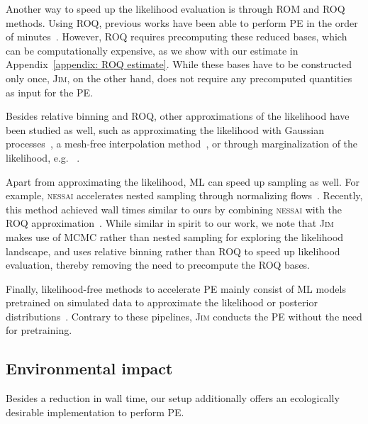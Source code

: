 \documentclass[prd,twocolumn,a4paper,floatfix,nofootinbib,preprintnumbers,superscriptaddress]{revtex4-1}
\begin{document}
Another way to speed up the likelihood evaluation is through \ac{ROM} and \ac{ROQ} methods. Using \ac{ROQ}, previous works have been able to perform \ac{PE} in the order of minutes~\cite{Canizares:2014fya, Morisaki:2020oqk, Morisaki:2023kuq}. However, \ac{ROQ} requires precomputing these reduced bases, which can be computationally expensive, as we show with our estimate in Appendix~\ref{appendix: ROQ estimate}. While these bases have to be constructed only once, \textsc{Jim}, on the other hand, does not require any precomputed quantities as input for the \ac{PE}.

Besides relative binning and \ac{ROQ}, other approximations of the likelihood have been studied as well, such as approximating the likelihood with Gaussian processes~\cite{Pankow:2015cra, Lange:2018pyp, Wysocki:2019grj},  a mesh-free interpolation method~\cite{Pathak:2022iar, Pathak:2023ixb}, or through marginalization of the likelihood, e.g. ~\cite{Roulet:2024hwz}. 

Apart from approximating the likelihood, \ac{ML} can speed up sampling as well. For example, \textsc{nessai} accelerates nested sampling through normalizing flows~\cite{Williams:2021qyt}. Recently, this method achieved wall times similar to ours by combining \textsc{nessai} with the \ac{ROQ} approximation~\cite{Williams:2023ppp}. While similar in spirit to our work, we note that \textsc{Jim} makes use of \ac{MCMC} rather than nested sampling for exploring the likelihood landscape, and uses relative binning rather than \ac{ROQ} to speed up likelihood evaluation, thereby removing the need to precompute the \ac{ROQ} bases.

Finally, likelihood-free methods to accelerate \ac{PE} mainly consist of \ac{ML} models pretrained on simulated data to approximate the likelihood or posterior distributions~\cite{Gabbard:2019rde, Kolmus:2021buf, Kolmus:2024scm, Chua:2019wwt, Green:2020hst, Green:2020dnx, Dax:2021tsq, Dax:2022pxd, Bhardwaj:2023xph}. Contrary to these pipelines, \textsc{Jim} conducts the \ac{PE} without the need for pretraining.\\

\subsection{Environmental impact}\label{sec: environmental impact}

Besides a reduction in wall time, our setup additionally offers an ecologically desirable implementation to perform \ac{PE}. 
\end{document}
